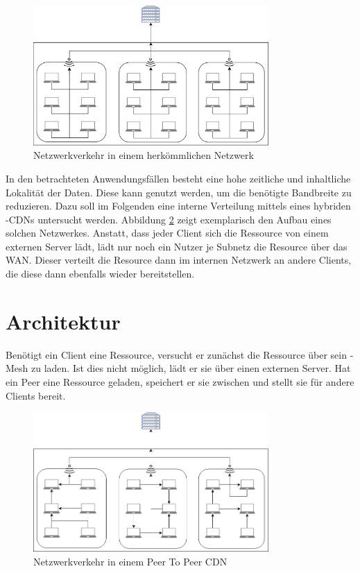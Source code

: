 \begin{figure}[!h]
	\centering
	\includegraphics[width=0.8\textwidth]{figures/network_current}
	\caption[Netzwerkverkehr in einem herkömmlichen Netzwerk]{Netzwerkverkehr in einem herkömmlichen Netzwerk}
	\label{fig:school}
\end{figure}

In den betrachteten Anwendungsfällen besteht eine hohe zeitliche und inhaltliche Lokalität der Daten. Diese kann genutzt werden, um die benötigte Bandbreite zu reduzieren. Dazu soll im Folgenden eine interne Verteilung mittels eines hybriden \pTp-CDNs untersucht werden. Abbildung \ref{fig:mesh} zeigt exemplarisch den Aufbau eines solchen Netzwerkes. Anstatt, dass jeder Client sich die Ressource von einem externen Server lädt, lädt nur noch ein Nutzer je Subnetz die Resource über das WAN. Dieser verteilt die Resource dann im internen Netzwerk an andere Clients, die diese dann ebenfalls wieder bereitstellen.

\section{Architektur}\label{k:architektur}

Benötigt ein Client eine Ressource, versucht er zunächst die Ressource über sein \pTp-Mesh zu laden. Ist dies nicht möglich, lädt er sie über einen externen Server. Hat ein Peer eine Ressource geladen, speichert er sie zwischen und stellt sie für andere Clients bereit.

\begin{figure}[!h]
	\centering
	\includegraphics[width=0.8\textwidth]{figures/network_p2p}
	\caption[Netzwerkverkehr in einem Peer To Peer CDN]{Netzwerkverkehr in einem Peer To Peer CDN}
	\label{fig:mesh}
\end{figure}

